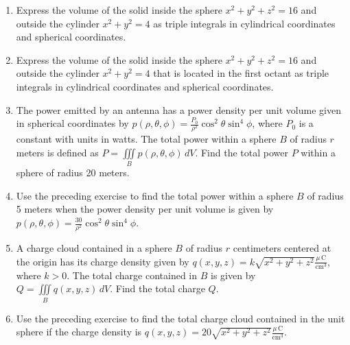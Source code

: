 \documentclass{exercises}
\begin{document}
\begin{enumerate}[resume]
\begin{enumerate}[label=(\alph*)]
  \item Use a CAS to find an approximation of the previous integral. Round your answer to two decimal places.
\end{enumerate}
\item Express the volume of the solid inside the sphere $x^{2}+y^{2}+z^{2}=16$ and outside the cylinder $x^{2}+y^{2}=4$ as triple integrals in cylindrical coordinates and spherical coordinates.
\item Express the volume of the solid inside the sphere $x^{2}+y^{2}+z^{2}=16$ and outside the cylinder $x^{2}+y^{2}=4$ that is located in the first octant as triple integrals in cylindrical coordinates and spherical coordinates.
\item The power emitted by an antenna has a power density per unit volume given in spherical coordinates by $p(\rho,\theta,\phi)=\frac{P_{0}}{\rho^{2}}\cos^{2}\theta \sin^{4}\phi$, where $P_{0}$ is a constant with units in watts. The total power within a sphere $B$ of radius $r$ meters is defined as $P=\underset{B}{\iiint}p(\rho,\theta,\phi)\,dV$. Find the total power $P$ within a sphere of radius 20 meters.
\item Use the preceding exercise to find the total power within a sphere $B$ of radius 5 meters when the power density per unit volume is given by $p(\rho,\theta,\phi)=\frac{30}{\rho^{2}}\cos^{2}\theta \sin^{4}\phi$.
\item A charge cloud contained in a sphere $B$ of radius $r$ centimeters centered at the origin has its charge density given by $q(x,y,z)=k\sqrt{x^{2}+y^{2}+z^{2}}\frac{\mu \,\text{C}}{\text{cm}^{3}}$, where $k>0$. The total charge contained in $B$ is given by $Q=\underset{B}{\iiint}q(x,y,z)\,dV$. Find the total charge $Q$.
\item Use the preceding exercise to find the total charge cloud contained in the unit sphere if the charge density is $q(x,y,z)=20\sqrt{x^{2}+y^{2}+z^{2}}\frac{\mu \,\text{C}}{\text{cm}^{3}}$.
\end{enumerate}
\end{document}
